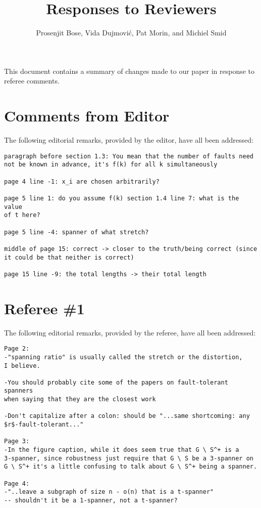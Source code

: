 \documentclass{patmorin}
\title{Responses to Reviewers}
\author{Prosenjit Bose, Vida Dujmovi\'c, Pat Morin, and Michiel Smid}
\begin{document}
\maketitle

This document contains a summary of changes made to our paper in response to referee comments.

\section{Comments from Editor}

The following editorial remarks, provided by the editor, have all been
addressed:

\begin{Verbatim}[frame=single]
paragraph before section 1.3: You mean that the number of faults need
not be known in advance, it's f(k) for all k simultaneously

page 4 line -1: x_i are chosen arbitrarily?

page 5 line 1: do you assume f(k) section 1.4 line 7: what is the value
of t here?

page 5 line -4: spanner of what stretch?

middle of page 15: correct -> closer to the truth/being correct (since
it could be that neither is correct)

page 15 line -9: the total lengths -> their total length
\end{Verbatim}

\section{Referee \#1}

The following editorial remarks, provided by the referee, have all been
addressed:

\begin{Verbatim}[frame=single]
Page 2:
-"spanning ratio" is usually called the stretch or the distortion,
I believe.

-You should probably cite some of the papers on fault-tolerant spanners
when saying that they are the closest work

-Don't capitalize after a colon: should be "...same shortcoming: any
$r$-fault-tolerant..."

Page 3:
-In the figure caption, while it does seem true that G \ S^+ is a
3-spanner, since robustness just require that G \ S be a 3-spanner on 
G \ S^+ it's a little confusing to talk about G \ S^+ being a spanner.

Page 4:
-"..leave a subgraph of size n - o(n) that is a t-spanner" 
-- shouldn't it be a 1-spanner, not a t-spanner?
\end{Verbatim}
\end{document}

